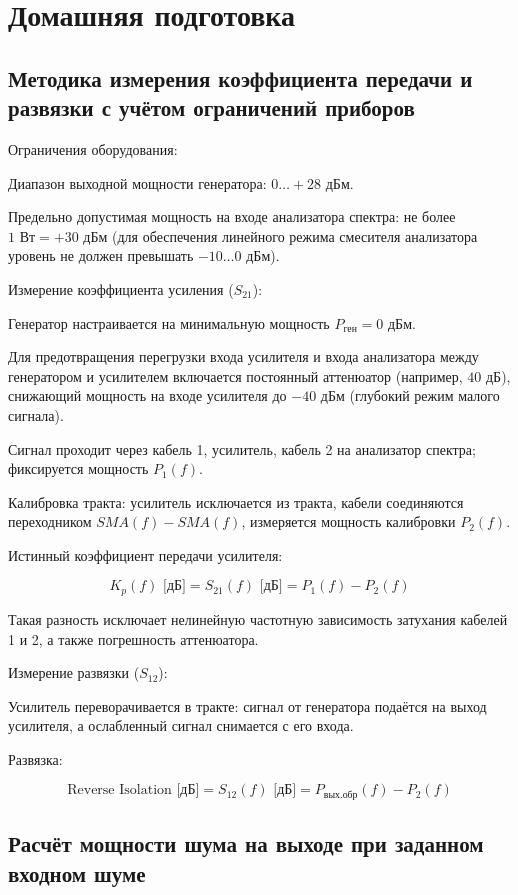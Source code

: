 \section{Домашняя подготовка}

\subsection* {Методика измерения коэффициента передачи и развязки с учётом ограничений приборов}

Ограничения оборудования:

Диапазон выходной мощности генератора: $0 \dots +28\text{ дБм}$.

Предельно допустимая мощность на входе анализатора спектра: не более $1\text{ Вт} = +30\text{ дБм}$ (для обеспечения линейного режима смесителя анализатора уровень не должен превышать $-10 \dots 0\text{ дБм}$).

Измерение коэффициента усиления ($S_{21}$):

Генератор настраивается на минимальную мощность $P_{\text{ген}} = 0\text{ дБм}$.

Для предотвращения перегрузки входа усилителя и входа анализатора между генератором и усилителем включается постоянный аттенюатор (например, $40\text{ дБ}$), снижающий мощность на входе усилителя до $-40\text{ дБм}$ (глубокий режим малого сигнала).

Сигнал проходит через кабель 1, усилитель, кабель 2 на анализатор спектра; фиксируется мощность $P_1(f)$.

Калибровка тракта: усилитель исключается из тракта, кабели соединяются переходником $SMA(f)-SMA(f)$, измеряется мощность калибровки $P_2(f)$.

Истинный коэффициент передачи усилителя:


$$K_p(f)\text{ [дБ]} = S_{21}(f)\text{ [дБ]} = P_1(f) - P_2(f)$$


Такая разность исключает нелинейную частотную зависимость затухания кабелей 1 и 2, а также погрешность аттенюатора.

Измерение развязки ($S_{12}$):

Усилитель переворачивается в тракте: сигнал от генератора подаётся на выход усилителя, а ослабленный сигнал снимается с его входа.

Развязка:


$$\text{Reverse Isolation [дБ]} = S_{12}(f)\text{ [дБ]} = P_{\text{вых.обр}}(f) - P_2(f)$$

\subsection* {Расчёт мощности шума на выходе при заданном входном шуме}

